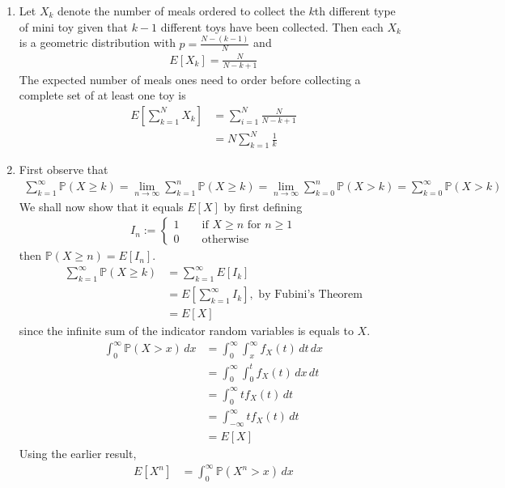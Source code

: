 \documentclass[a4paper,10pt]{article}
\theoremstyle{definition}
\begin{document}
\begin{enumerate}
\item Let $X_k$ denote the number of meals ordered to collect the $k$th different type of mini toy given that $k-1$ different toys have been collected. Then each $X_k$ is a geometric distribution with $p=\frac{N-(k-1)}{N}$ and 
\begin{align*}
E[X_k] =\frac{N}{N-k+1}
\end{align*}
The expected number of meals ones need to order before collecting a complete set of at least one toy is 
\begin{align*}
E\left[\sum_{k=1}^{N}X_k\right]&=\sum_{i=1}^{N}\frac{N}{N-k+1}\\
&=N\sum_{k=1}^{N}\frac{1}{k}
\end{align*}
\item 
First observe that 
\begin{align*}
\sum_{k=1}^{\infty}\mathbb{P}(X\geq k) = \lim_{n\to\infty}\sum_{k=1}^{n}\mathbb{P}(X\geq k)=\lim_{n\to\infty}\sum_{k=0}^{n}\mathbb{P}(X> k)=\sum_{k=0}^{\infty}\mathbb{P}(X>k)
\end{align*}
We shall now show that it equals $E[X]$ by first defining
\begin{align*}
I_n:=
\begin{cases}
1 \qquad \text{if $X \geq n$ for $n \geq 1$}\\
0 \qquad \text{otherwise}
\end{cases}
\end{align*}
then $\mathbb{P}(X\geq n) = E[I_n]$.
\begin{align*}
\sum_{k=1}^{\infty}\mathbb{P}(X\geq k) &= \sum_{k=1}^{\infty}E[I_k] \\
&= E\left[\sum_{k=1}^{\infty}I_k\right], 
\text{ by Fubini's Theorem}\\
&=E[X]
\end{align*}
since the infinite sum of the indicator random variables is equals to $X$.
\vspace{-.05cm}
\begin{align*}
\int_{0}^{\infty}\mathbb{P}(X>x) \,dx&= \int_{0}^{\infty}\int_{x}^{\infty}f_X(t) \,dt\,dx\\
&= \int_{0}^{\infty}\int_{0}^{t}f_X(t) \,dx\,dt\\
&= \int_{0}^{\infty}tf_X(t) \,dt\\
&= \int_{-\infty}^{\infty}tf_X(t) \,dt\\
&=E[X]
\end{align*}
Using the earlier result,
\begin{align*}
E[X^n] &=\int_{0}^{\infty}\mathbb{P}(X^n>x)\,dx\\

\end{align*}
\end{enumerate}
\end{document}
